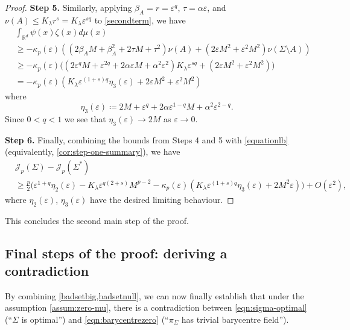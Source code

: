 \documentclass[preprint, reqno]{amsart}
\renewcommand{\epsilon}{\varepsilon}
\theoremstyle{definition}
\numberwithin{equation}{section}
\begin{document}
\begin{proof}
  \textbf{Step 5.} Similarly, applying $\beta_A = r = \epsilon^q$,
  $\tau = \alpha \epsilon$, and $\nu(A) \leq K_\lambda r^s = K_\lambda
  \epsilon^{sq}$ to \eqref{secondterm}, we have
  \begin{align*}
    &\int_{\mathbb{R}^d}\psi(x)\zeta(x) d\mu(x)\\\nonumber
    &\geq - \kappa_p(\epsilon) \left((2\beta_A M + \beta_A^2 + 2\tau M +
      \tau^2)\nu(A) + (2\epsilon M^2 + \epsilon^2 M^2)\nu(\Sigma
      \setminus A)\right) \\
    &\geq -\kappa_p (\epsilon)\big((2\epsilon^q M + \epsilon^{2q} +
      2\alpha \epsilon M + \alpha^2 \epsilon^2) K_\lambda \epsilon^{sq}
      + (2\epsilon M^2 + \epsilon^2 M^2)\big) \\
    & = -\kappa_p(\epsilon) (K_\lambda \epsilon^{(1 + s)q}
      \eta_3(\epsilon) + 2\epsilon M^2 + \epsilon^2 M^2)
  \end{align*}
  where
  \[
    \eta_3(\epsilon) \coloneqq 2M + \epsilon^q + 2 \alpha \epsilon^{1
      - q}M + \alpha^2 \epsilon^{2 - q}.
  \]
  Since $0 < q < 1$ we see that $\eta_3(\epsilon)\to 2M$ as $\epsilon
  \to 0$.

  \textbf{Step 6.} Finally, combining the bounds from Steps 4 and 5 with
  \eqref{equationlb} (equivalently, \cref{cor:step-one-summary}), we
  have
  \begin{align*}
    & \mathscr{J}_p(\Sigma) - \mathscr{J}_p(\Sigma^*)\\
    & \ge \frac{p}{2}\Big( \epsilon^{1+q} \eta_2(\epsilon) -K_\lambda
      \epsilon^{q(2+s)} M^{p-2}- \kappa_p(\epsilon)
      (K_{\lambda}\epsilon^{(1 + s)q} \eta_3(\epsilon) + 2 M^2 \epsilon)
      \Big) + O(\epsilon^2),
  \end{align*}
  where $\eta_2(\epsilon)$, $\eta_3(\epsilon)$ have the desired limiting
  behaviour.
\end{proof}

This concludes the second main step of the proof.

\subsection{Final steps of the proof{: deriving a
    contradiction}} \label{sec:finalsteps}

By combining \cref{badsetbig,badsetnull}, we can now finally establish
that under the assumption \eqref{assum:zero-mu}, there is a
contradiction between \eqref{eqn:sigma-optimal} (``$\Sigma$ is
optimal'') and \eqref{eqn:barycentrezero} (``$\pi_\Sigma$ has trivial
barycentre field'').
\end{document}
